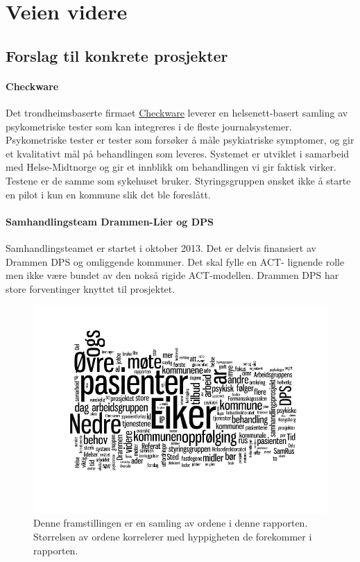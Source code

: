 \documentclass[11pt]{report} %
\begin{document}
              \chapter{Veien videre}\label{chap:vvidere}
                \section{Forslag til konkrete prosjekter}\label{chap:vvidere_konkpr}
                  \subsubsection{Checkware} 
                    Det trondheimsbaserte firmaet \href{http://checkware.com/}{Checkware} leverer en helsenett-basert samling av psykometriske tester som kan integreres i de fleste journalsystemer. Psykometriske tester er tester som forsøker å måle psykiatriske symptomer, og gir et kvalitativt mål på behandlingen som leveres. Systemet er utviklet i samarbeid med Helse-Midtnorge og gir et innblikk om behandlingen vi gir faktisk virker. Testene er de samme som sykehuset bruker. Styringsgruppen ønsket ikke å starte en pilot i kun en kommune slik det ble foreslått.
                  \subsubsection{Samhandlingsteam Drammen-Lier og DPS}
                    Samhandlingsteamet er startet i oktober 2013. Det er delvis finansiert av Drammen DPS og omliggende kommuner. Det skal fylle en ACT- lignende rolle men ikke være bundet av den nokså rigide ACT-modellen. Drammen DPS har store forventinger knyttet til prosjektet.
                  \begin{figure}[h]
                    \begin{mdframed}[style=mystyle]
                    \centering
                    \includegraphics[width=4.5in]{./pix/ordskysamrusv2}
                    \caption[Ordskyframstilling av denne \textit{rapporten}.]
                     {Denne framstillingen er en samling av ordene i denne rapporten. Størrelsen av ordene korrelerer med hyppigheten de forekommer i rapporten.}
                  \end{mdframed}
                  \end{figure}
\end{document}
